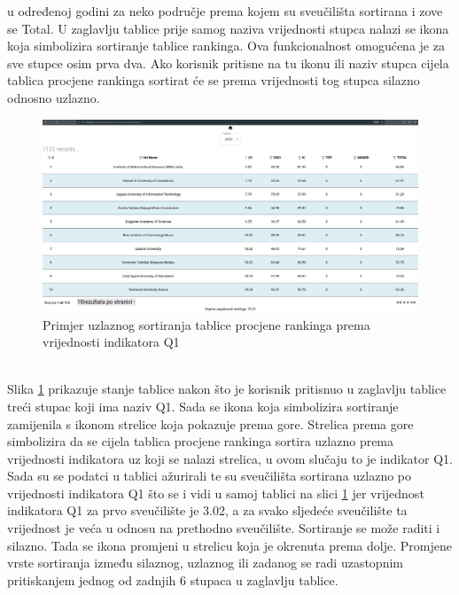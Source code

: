 \documentclass[times, utf8, zavrsni]{fer}
\begin{document}
u određenoj godini za neko područje prema kojem su sveučilišta sortirana i zove se Total. U zaglavlju tablice prije samog naziva vrijednosti stupca nalazi se ikona koja simbolizira
sortiranje tablice rankinga. Ova funkcionalnost omogućena je za sve stupce osim prva dva. Ako korisnik pritisne na tu ikonu ili naziv stupca cijela tablica 
procjene rankinga sortirat će se prema vrijednosti tog stupca silazno odnosno uzlazno. 
\begin{figure}[htb]
    \hspace*{-2cm}  
       \includegraphics[scale=0.21]{sort1.png} 
       \caption{Primjer uzlaznog sortiranja tablice procjene rankinga prema vrijednosti indikatora Q1}
       \label{fig:sort1}
       \end{figure}
\\Slika \ref{fig:sort1} prikazuje stanje tablice nakon što je korisnik pritisnuo u zaglavlju tablice treći stupac koji ima naziv Q1. Sada se ikona koja simbolizira
sortiranje zamijenila s ikonom strelice koja pokazuje prema gore. Strelica prema gore simbolizira da se cijela tablica procjene rankinga
sortira uzlazno prema vrijednosti indikatora uz koji se nalazi strelica, u ovom slučaju to je indikator Q1. Sada su se podatci u tablici 
ažurirali te su sveučilišta sortirana uzlazno po vrijednosti indikatora Q1 što se i vidi u samoj tablici na slici \ref{fig:sort1} jer vrijednost indikatora Q1 za prvo 
sveučilište je 3.02, a za svako sljedeće sveučilište ta vrijednost je veća u odnosu na prethodno sveučilište. Sortiranje se može raditi i silazno. Tada se ikona promjeni
u strelicu koja je okrenuta prema dolje. Promjene vrste sortiranja između silaznog, uzlaznog ili zadanog  se radi uzastopnim pritiskanjem 
jednog od zadnjih 6 stupaca u zaglavlju tablice.
\end{document}
